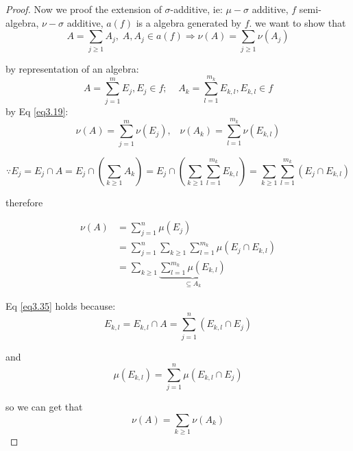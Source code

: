 \begin{proof}
    Now we proof the extension of {\color{blue} $ \sigma $}-additive, ie: $ \mu-\sigma $ additive, $ f $ semi-algebra, $ \nu -\sigma $ additive, $ a(f) $ is a algebra generated by $ f. $ we want to show that
    \begin{equation}
    A = \sum\limits_{j \geqslant 1} {{A_j}} ,\;A,{A_j} \in a\left( f \right) \Rightarrow \nu \left( A \right) = \sum\limits_{j \geqslant 1} {\nu \left( {{A_j}} \right)} 
    \end{equation}
    
    by representation of an algebra:
    \begin{equation}
    A = \sum\limits_{j = 1}^m {{E_j}} ,{E_j} \in f;\;\;\;\;{A_k} = \sum\limits_{l = 1}^{{m_k}} {{E_{k,l}}} ,{E_{k,l}} \in f
    \end{equation}
    by Eq \ref{eq3.19}:
    \begin{equation}
    \nu \left( A \right) = \sum\limits_{j = 1}^m {\nu \left( {{E_j}} \right)} ,\;\;\;\nu \left( {{A_k}} \right) = \sum\limits_{l = 1}^{{m_k}} {\nu \left( {{E_{k,l}}} \right)} 
    \end{equation}
    
   \begin{equation}
   \because {E_j} = {E_j} \cap A = {E_j} \cap \left( {\sum\limits_{k \geqslant 1} {{A_k}} } \right) = {E_j} \cap \left( {\sum\limits_{k \geqslant 1} {\sum\limits_{l = 1}^{{m_k}} {{E_{k,l}}} } } \right) = \sum\limits_{k \geqslant 1} {\sum\limits_{l = 1}^{{m_k}} {\left( {{E_j} \cap {E_{k,l}}} \right)} } 
   \end{equation}
   
   therefore
   
   \begin{equation}
   \begin{split}
   \nu \left( A \right) & = \sum\limits_{j = 1}^n {\mu \left( {{E_j}} \right)}\\
   						& = \sum\limits_{j = 1}^n {\sum\limits_{k \geqslant 1} {\sum\limits_{l = 1}^{{m_k}} {\mu \left( {{E_j} \cap {E_{k,l}}} \right)} } } \\
   						& = \sum\limits_{k \geqslant 1} {\underbrace {\sum\limits_{l = 1}^{{m_k}} {\mu \left( {{E_{k,l}}} \right)} }_{ \subseteq {A_k}}} 
   \end{split}
   \label{eq3.35}
   \end{equation}
   
   Eq \ref{eq3.35} holds because:
   \begin{equation}
  {E_{k,l}} = {E_{k,l}} \cap A = \sum\limits_{j = 1}^n {\left( {{E_{k,l}} \cap {E_j}} \right)} 
  \label{eq3.36}
   \end{equation}
   
   and
   \begin{equation}
   \mu \left( {{E_{k,l}}} \right) = \sum\limits_{j = 1}^n {\mu \left( {{E_{k,l}} \cap {E_j}} \right)} 
   \end{equation}
   
   so we can get that
   \begin{equation}
   \nu \left( A \right) = \sum\limits_{k \geqslant 1} {\nu \left( {{A_k}} \right)}
   \label{eq3.38} 
   \end{equation}
   
\end{proof}